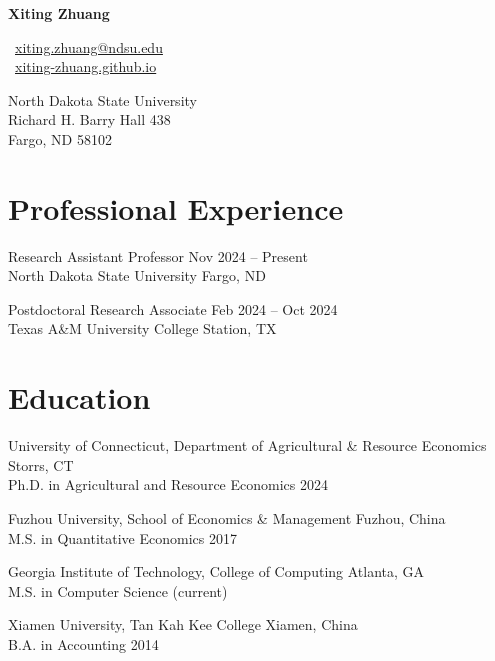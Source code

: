 \documentclass[10.8 pt,letterpaper]{article}
\def\name{Xiting Zhuang}
\renewenvironment{itemize}{
	\begin{list}{}{
			\setlength{\leftmargin}{1.5em}
		}
	}{
	\end{list}
}
\begin{document}
	
	{\huge \textbf{\name}}
	
	\vspace{0.25in}
	
 

\noindent
\begin{minipage}[t]{0.50\textwidth}
	\faEnvelope\ \href{mailto:xiting.zhuang@ndsu.edu}{xiting.zhuang@ndsu.edu} \\
	\faGlobe\ \href{https://xiting-zhuang.github.io}{xiting-zhuang.github.io}
\end{minipage}\hfill
\begin{minipage}[t]{0.47\textwidth}
	\raggedleft
	North Dakota State University \\
	Richard H. Barry Hall 438 \\
	Fargo, ND 58102
\end{minipage}

	
	\section*{\textbf{Professional Experience}}
	
	\begin{itemize}
		
		\item[-]  Research Assistant Professor \hfill Nov 2024 – Present \\
		North Dakota State University   \hfill Fargo, ND  
		
		\item[-]  Postdoctoral Research Associate  \hfill Feb 2024 – Oct 2024 \\
		Texas A\&M University \hfill College Station, TX
		
	\end{itemize}
	
	\section*{\textbf{Education}}
	\begin{itemize}
		\item[-] University of Connecticut, Department of Agricultural \& Resource Economics \hfill Storrs, CT \\
		Ph.D. in Agricultural and Resource Economics  \hfill 2024
		
		\item[-] Fuzhou University, School of Economics \& Management \hfill Fuzhou, China \\
		M.S. in Quantitative Economics \hfill 2017
		
		\item[-] Georgia Institute of Technology, College of Computing \hfill Atlanta, GA \\
		M.S. in Computer Science (current)
		
		\item[-] Xiamen University, Tan Kah Kee College \hfill Xiamen, China \\
		B.A. in Accounting \hfill 2014
	\end{itemize}
	
\end{document}
